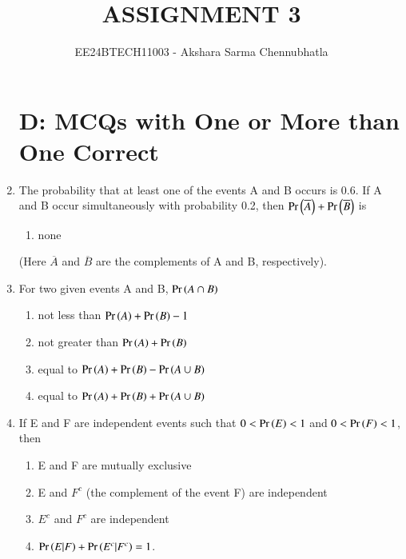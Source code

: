 \documentclass[journal,12pt,twocolumn,article]{IEEEtran}
\theoremstyle{remark}
\begin{document}
\begin{enumerate}[start = 3]

\vspace{3cm}
\title{ASSIGNMENT 3}
\author{EE24BTECH11003 - Akshara Sarma Chennubhatla}
\maketitle
\newpage
\bigskip
\section*{D: MCQs with One or More than One Correct}
\item The probability that at least one of the events A and B occurs is 0.6. If A and B occur simultaneously with probability 0.2, then $\Pr\left(\overline{A}\right)+\Pr\left(\overline{B}\right)$ is
\hfill{}
\begin{enumerate}
\item none
\end{enumerate}
(Here $\overline{A}$ and $\overline{B}$ are the complements of A and B, respectively).
\item For two given events A and B, $\Pr\left(A \cap B\right)$
\hfill{}
\begin{enumerate}
\item not less than $\Pr\left(A\right)+\Pr\left(B\right)-1$
\item not greater than $\Pr\left(A\right)+\Pr\left(B\right)$
\item equal to $\Pr\left(A\right)+\Pr\left(B\right)-\Pr\left(A \cup B\right)$
\item equal to $\Pr\left(A\right)+\Pr\left(B\right)+\Pr\left(A \cup B\right)$
\end{enumerate}
\item If E and F are independent events such that $0<\Pr\left(E\right)<1$ and $0<\Pr\left(F\right)<1$, then 
\hfill{}
\begin{enumerate}
\item E and F are mutually exclusive
\item E and $F^c$ (the complement of the event F) are independent
\item $E^c$ and $F^c$ are independent
\item $\Pr\left(E|F\right)+\Pr\left(E^c|F^c\right)=1$.
\end{enumerate}

\end{enumerate}
\end{document}
